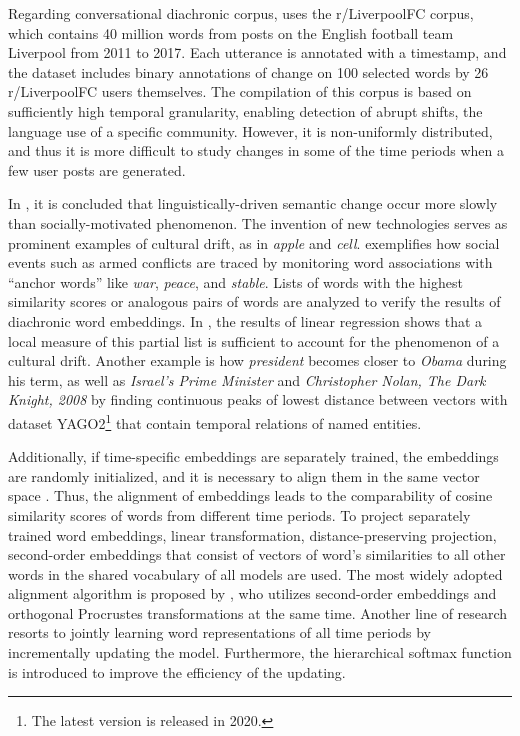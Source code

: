 Regarding conversational diachronic corpus, \parencite{giulianelli2019lexical} uses the r/LiverpoolFC corpus, which contains 40 million words from posts on the English football team Liverpool from 2011 to 2017. Each utterance is annotated with a timestamp, and the dataset includes binary annotations of change on 100 selected words by 26 r/LiverpoolFC users themselves. The compilation of this corpus is based on sufficiently high temporal granularity, enabling detection of abrupt shifts, the language use of a specific community. However, it is non-uniformly distributed, and thus it is more difficult to study changes in some of the time periods when a few user posts are generated.


In \textcite{hamilton2016cultural}, it is concluded that linguistically-driven semantic change occur more slowly than socially-motivated phenomenon. The invention of new technologies serves as prominent examples of cultural drift, as in \textit{apple} and \textit{cell}. \textcite{kutuzov2017tracing} exemplifies how social events such as armed conflicts are traced by monitoring word associations with ``anchor words'' like \textit{war}, \textit{peace}, and \textit{stable}. Lists of words with the highest similarity scores or analogous pairs of words are analyzed to verify the results of diachronic word embeddings. In \textcite{hamilton2016cultural}, the results of linear regression shows that a local measure of this partial list is sufficient to account for the phenomenon of a cultural drift. Another example is how \textit{president} becomes closer to \textit{Obama} during his term, as well as \textit{Israel’s Prime Minister} and \textit{Christopher Nolan, The
Dark Knight, 2008} \parencite{rosin2017learning} by finding continuous peaks of lowest distance between vectors with dataset YAGO2\footnote{The latest version is released in 2020.} that contain temporal relations of named entities.

Additionally, if time-specific embeddings are separately trained, the embeddings are randomly initialized, and it is necessary to align them in the same vector space \parencite{hamilton2016law}. Thus, the alignment of embeddings leads to the comparability of cosine similarity scores of words from different time periods. To project separately trained word embeddings, linear transformation, distance-preserving projection, second-order embeddings that consist of vectors of word's similarities to all other words in the shared vocabulary of all models are used. The most widely adopted alignment algorithm is proposed by \textcite{hamilton2016law}, who utilizes second-order embeddings and orthogonal Procrustes transformations at the same time. Another line of research resorts to jointly learning word representations of all time periods by incrementally updating the model. Furthermore, the hierarchical softmax function is introduced to improve the efficiency of the updating.

